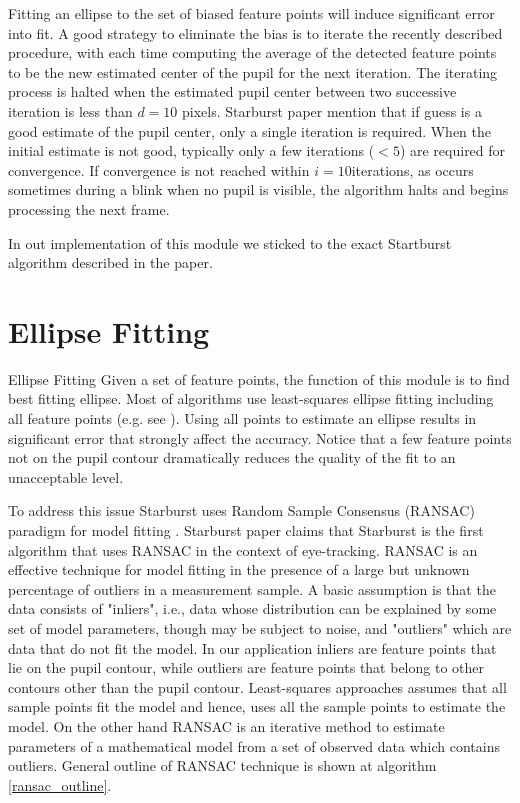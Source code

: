 Fitting an ellipse to the set of biased feature points will induce significant error into fit. A good strategy to eliminate the bias is to iterate the recently described procedure, with each time computing the average of the detected feature points to be the new estimated center of the pupil for the next iteration. The iterating process is halted when the estimated pupil center between two successive iteration is less than $d = 10$ pixels. Starburst paper mention that if guess is a good estimate of the pupil center, only a single iteration is required. When the initial estimate is not good, typically only a few iterations ($< 5$) are required for convergence. If convergence is not reached within $i = 10 $iterations, as occurs sometimes during a blink when no pupil is visible, the algorithm halts and begins processing the next frame. \bigskip

\begin{our}
In out implementation of this module we sticked to the exact Startburst algorithm described in the paper.
\end{our}


\section{Ellipse Fitting}{Ellipse Fitting}
Given a set of feature points, the function of this module is to find best fitting ellipse.  Most of algorithms use least-squares ellipse fitting including all feature points (e.g. see \cite{least_squares}). Using all points to estimate an ellipse results in significant error that strongly affect the accuracy. Notice that a few feature points not on the pupil contour dramatically reduces the quality of the fit to an unacceptable level.  \bigskip

To address this issue Starburst uses Random Sample Consensus (RANSAC) paradigm for model fitting \cite{ransac}. Starburst paper claims that Starburst is the first algorithm that uses RANSAC in the context of eye-tracking. RANSAC is an effective technique for model fitting in the presence of a large but unknown percentage of outliers in a measurement sample. A basic assumption is that the data  consists of "inliers", i.e., data whose distribution can be explained by some set of model parameters, though may be subject to noise, and "outliers" which are data that do not fit the model. In our application inliers are feature points that lie on the pupil contour, while outliers are feature points that belong to other contours other than the pupil contour. Least-squares approaches assumes that all sample points fit the model and hence, uses all the sample points to estimate the model. On the other hand RANSAC is an iterative method to estimate parameters of a mathematical model from a set of observed data which contains outliers. General outline of RANSAC technique is shown at algorithm \ref{ransac_outline}. \bigskip

